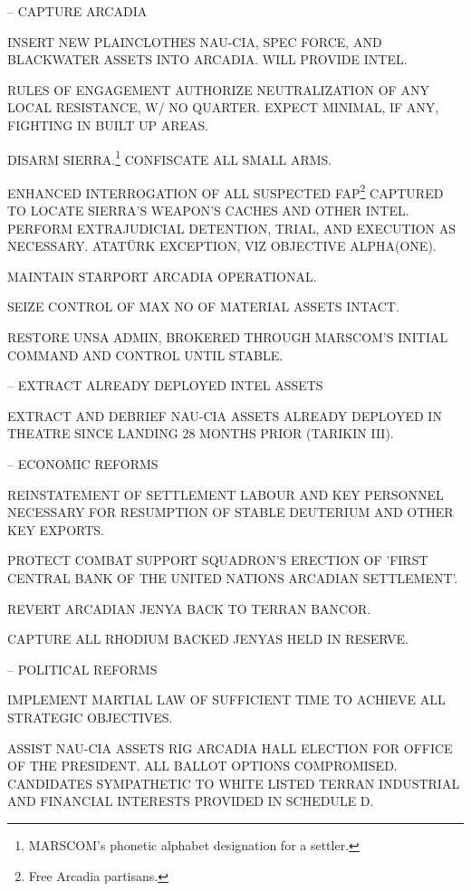 \item {} -- CAPTURE ARCADIA
    \startitemize[n]
    \item INSERT NEW PLAINCLOTHES NAU-CIA, SPEC FORCE, AND BLACKWATER ASSETS INTO ARCADIA. WILL PROVIDE INTEL.
    \item RULES OF ENGAGEMENT AUTHORIZE NEUTRALIZATION OF ANY LOCAL RESISTANCE, W/ NO QUARTER. EXPECT MINIMAL, IF ANY, FIGHTING IN BUILT UP AREAS.
    \item DISARM SIERRA.\footnote{MARSCOM's phonetic alphabet designation for a settler.} CONFISCATE ALL SMALL ARMS.
    \item ENHANCED INTERROGATION OF ALL SUSPECTED FAP\footnote{Free Arcadia partisans.} CAPTURED TO LOCATE SIERRA'S WEAPON'S CACHES AND OTHER INTEL. PERFORM EXTRAJUDICIAL DETENTION, TRIAL, AND EXECUTION AS NECESSARY. ATATÜRK EXCEPTION, VIZ OBJECTIVE ALPHA(ONE).
    \item MAINTAIN STARPORT ARCADIA OPERATIONAL.
    \item SEIZE CONTROL OF MAX NO OF MATERIAL ASSETS INTACT.
    \item RESTORE UNSA ADMIN, BROKERED THROUGH MARSCOM'S INITIAL COMMAND AND CONTROL UNTIL STABLE.
    \stopitemize

\item {} -- EXTRACT ALREADY DEPLOYED INTEL ASSETS
    \startitemize[n]
    \item EXTRACT AND DEBRIEF NAU-CIA ASSETS ALREADY DEPLOYED IN THEATRE SINCE LANDING 28 MONTHS PRIOR (TARIKIN III).
    \stopitemize

\item {} -- ECONOMIC REFORMS
    \startitemize[n]
    \item REINSTATEMENT OF SETTLEMENT LABOUR AND KEY PERSONNEL NECESSARY FOR RESUMPTION OF STABLE DEUTERIUM AND OTHER KEY EXPORTS.
    \item PROTECT COMBAT SUPPORT SQUADRON'S ERECTION OF 'FIRST CENTRAL BANK OF THE UNITED NATIONS ARCADIAN SETTLEMENT'.
    \item REVERT ARCADIAN JENYA BACK TO TERRAN BANCOR.
    \item CAPTURE ALL RHODIUM BACKED JENYAS HELD IN RESERVE.
    \stopitemize

\item {} -- POLITICAL REFORMS
    \startitemize[n]
    \item IMPLEMENT MARTIAL LAW OF SUFFICIENT TIME TO ACHIEVE ALL STRATEGIC OBJECTIVES.
    \item ASSIST NAU-CIA ASSETS RIG ARCADIA HALL ELECTION FOR OFFICE OF THE PRESIDENT. ALL BALLOT OPTIONS COMPROMISED. CANDIDATES SYMPATHETIC TO WHITE LISTED TERRAN INDUSTRIAL AND FINANCIAL INTERESTS PROVIDED IN SCHEDULE D.
    \stopitemize
\stopitemize

